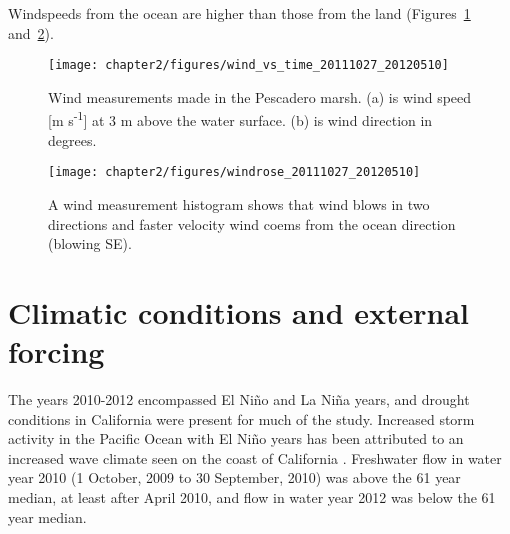 Windspeeds from the ocean are higher than those from the land (Figures~\ref{fig:metstn_pdo_ws_wdir} and~\ref{fig:metstn_pdo_windrose}). 


\begin{figure}[h!] %
	\texttt{[image: chapter2/figures/wind\_vs\_time\_20111027\_20120510]} \caption{Wind measurements made in the Pescadero marsh. (a) is wind speed [m s\textsuperscript{-1}] at 3 m above the water surface. (b) is wind direction in degrees.}
\label{fig:metstn_pdo_ws_wdir} 
\end{figure}

 \begin{figure}[h]
 	\begin{center}
 		\texttt{[image: chapter2/figures/windrose\_20111027\_20120510]} \caption{A wind measurement histogram shows that wind blows in two directions and faster velocity wind coems from the ocean direction (blowing SE).} \label{fig:metstn_pdo_windrose} 
 	\end{center}
 \end{figure}

\section{Climatic conditions and external forcing} \label{conditions_label}
The years 2010-2012 encompassed El Ni\~{n}o and La Ni\~{n}a years, and drought conditions in California were present for much of the study. Increased storm activity in the Pacific Ocean with El Ni\~{n}o years has been attributed to an increased wave climate seen on the coast of California \parencite{seymour_influence_1984}. Freshwater flow in water year 2010 (1 October, 2009 to 30 September, 2010) was above the 61 year median, at least after April 2010, and flow in water year 2012 was below the 61 year median. 


